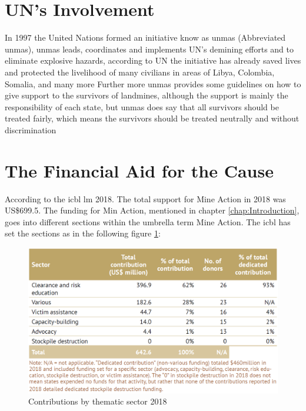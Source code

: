 \section{UN's Involvement}

In 1997 the United Nations formed an initiative know as \gls{unmas} (Abbreviated \gls{unmas}), \gls{unmas} leads, coordinates and implements UN's demining efforts and to eliminate explosive hazards, according to UN the initiative has already saved lives and protected the livelihood of many civilians in areas of Libya, Colombia, Somalia, and many more
Further more \gls{unmas} provides some guidelines on how to give support to the survivors of landmines, although the support is mainly the responsibility of each state, but \gls{unmas} does say that all survivors should be treated fairly, which means the survivors should be treated neutrally and without discrimination

\newpage

\section{The Financial Aid for the Cause}

According to the \gls{icbl} \gls{lm} 2018. The total support for Mine Action in 2018 was US\$699.5. The funding for Min Action, mentioned in chapter \ref{chap:Introduction}, goes into different sections within the umbrella term Mine Action. The \gls{icbl} has set the sections as in the following figure \ref{fig:contributions_by_thematic_sector_2018}:

\begin{figure}[ht]
  \centering
  \includegraphics[width=0.6\linewidth]{00 - Images/contributions_by_thematic_sector_2018.png}
  \caption{Contributions by thematic sector 2018 \cite{LandmineMonitor2019}}
  \label{fig:contributions_by_thematic_sector_2018}
\end{figure}


